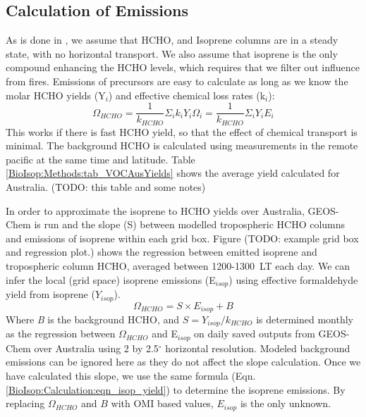   \subsection{Calculation of Emissions}
    \label{BioIsop:Calculation}
   
    As is done in \textcite{Palmer2003, Millet2006, Bauwens2016}, we assume that HCHO, and Isoprene columns are in a steady state, with no horizontal transport.
    We also assume that isoprene is the only compound enhancing the HCHO levels, which requires that we filter out influence from fires.
    Emissions of precursors are easy to calculate as long as we know the molar HCHO yields (Y$_i$) and effective chemical loss rates (k$_i$):
    \begin{equation}
    \Omega_{HCHO} = \frac{1}{k_{HCHO}}\Sigma_i k_i Y_i \Omega_i = \frac{1}{k_{HCHO}}\Sigma_i Y_i E_i
    \end{equation}
    This works if there is fast HCHO yield, so that the effect of chemical transport is minimal.
    The background HCHO is calculated using measurements in the remote pacific at the same time and latitude.
    Table \ref{BioIsop:Methods:tab_VOCAusYields} shows the average yield calculated for Australia. (TODO: this table and some notes)
    
    In order to approximate the isoprene to HCHO yields over Australia, GEOS-Chem is run and the slope (S) between modelled tropospheric HCHO columns and emissions of isoprene within each grid box. 
    Figure (TODO: example grid box and regression plot.) shows the regression between emitted isoprene and tropospheric column HCHO, averaged between 1200-1300~LT each day.
    We can infer the local (grid space) isoprene emissions (E$_{isop}$) using effective formaldehyde yield from isoprene ($Y_{isop}$).
    \begin{equation} \label{BioIsop:Calculation:eqn_isop_yield}
    \Omega_{HCHO} = S \times E_{isop} + B
    \end{equation}
    Where \textit{B} is the background HCHO, and $S = Y_{isop}/k_{HCHO}$ is determined monthly as the regression between $\Omega_{HCHO}$ and E$_{isop}$ on daily saved outputs from GEOS-Chem over Australia using 2 by 2.5$^{\circ}$ horizontal resolution. 
    Modeled background emissions can be ignored here as they do not affect the slope calculation.
    Once we have calculated this slope, we use the same formula (Eqn. \ref{BioIsop:Calculation:eqn_isop_yield}) to determine the isoprene emissions.
    By replacing $\Omega_{HCHO}$ and $B$ with OMI based values, $E_{isop}$ is the only unknown.
    
